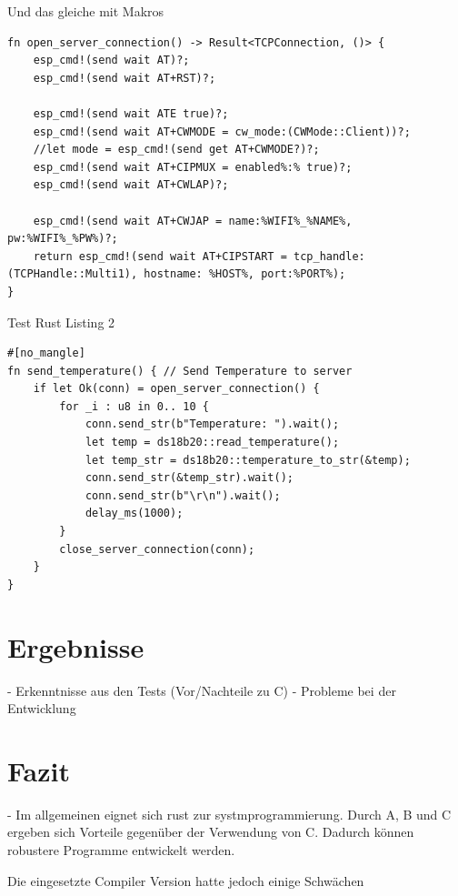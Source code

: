 \documentclass
[ 12pt,
  parskip=half %
]{scrreprt}
\newenvironment{mylisting}[1][H]
{\captionsetup{aboveskip=-0.2\normalbaselineskip}\begin{listing}[#1]}
	{\end{listing}}
\begin{document}
\begin{mylisting}[H]
	\caption{Und das gleiche mit Makros}
	\begin{verbatim}
fn open_server_connection() -> Result<TCPConnection, ()> {
	esp_cmd!(send wait AT)?;
	esp_cmd!(send wait AT+RST)?;
	
	esp_cmd!(send wait ATE true)?;
	esp_cmd!(send wait AT+CWMODE = cw_mode:(CWMode::Client))?;
	//let mode = esp_cmd!(send get AT+CWMODE?)?; 
	esp_cmd!(send wait AT+CIPMUX = enabled%:% true)?;
	esp_cmd!(send wait AT+CWLAP)?;
	
	esp_cmd!(send wait AT+CWJAP = name:%WIFI%_%NAME%, pw:%WIFI%_%PW%)?;
	return esp_cmd!(send wait AT+CIPSTART = tcp_handle:(TCPHandle::Multi1), hostname: %HOST%, port:%PORT%);
}
	\end{verbatim}
\end{mylisting} 

\begin{mylisting}[H]
	\caption{Test Rust Listing 2}
	\begin{verbatim}
#[no_mangle]
fn send_temperature() { // Send Temperature to server
	if let Ok(conn) = open_server_connection() {
		for _i : u8 in 0.. 10 {
			conn.send_str(b"Temperature: ").wait();
			let temp = ds18b20::read_temperature();
			let temp_str = ds18b20::temperature_to_str(&temp);
			conn.send_str(&temp_str).wait();
			conn.send_str(b"\r\n").wait();
			delay_ms(1000);
		}
		close_server_connection(conn);
	}
}
	\end{verbatim}
\end{mylisting} 

\chapter{Ergebnisse}
- Erkenntnisse aus den Tests
	(Vor/Nachteile zu C)
- Probleme bei der Entwicklung 


\chapter{Fazit}

- Im allgemeinen eignet sich rust zur systmprogrammierung. Durch A, B und C ergeben sich Vorteile gegenüber der Verwendung von C. Dadurch können robustere Programme entwickelt werden.

Die eingesetzte Compiler Version hatte jedoch einige Schwächen
\end{document}
